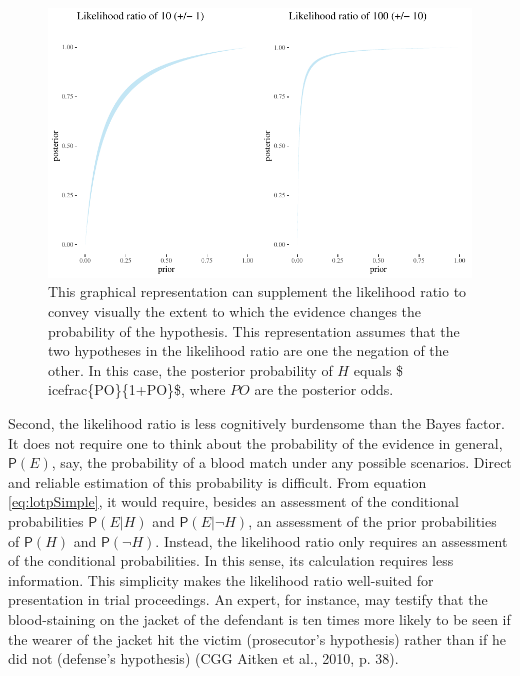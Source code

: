 \documentclass[
  letterpaper,
  DIV=11,
  numbers=noendperiod]{scrartcl}
\newcommand{\pr}[1]{\mathsf{P}(#1)}
\begin{document}
\begin{figure}[h]

{\centering \includegraphics[width=1\textwidth,height=\textheight]{Quart_lr-chapter6_files/figure-pdf/fig-effect-evidence-1.pdf}

}

\caption{\label{fig-effect-evidence}This graphical representation can
supplement the likelihood ratio to convey visually the extent to which
the evidence changes the probability of the hypothesis. This
representation assumes that the two hypotheses in the likelihood ratio
are one the negation of the other. In this case, the posterior
probability of \(H\) equals \$ icefrac\{PO\}\{1+PO\}\$, where \(PO\) are
the posterior odds.}

\end{figure}

Second, the likelihood ratio is less cognitively burdensome than the
Bayes factor. It does not require one to think about the probability of
the evidence in general, \(\pr{E}\), say, the probability of a blood
match under any possible scenarios. Direct and reliable estimation of
this probability is difficult. From equation \eqref{eq:lotpSimple}, it
would require, besides an assessment of the conditional probabilities
\(\pr{E\vert H}\) and \(\pr{E\vert \neg H}\), an assessment of the prior
probabilities of \(\pr{H}\) and \(\pr{\neg H}\). Instead, the likelihood
ratio only requires an assessment of the conditional probabilities. In
this sense, its calculation requires less information. This simplicity
makes the likelihood ratio well-suited for presentation in trial
proceedings. An expert, for instance, may testify that the
blood-staining on the jacket of the defendant is ten times more likely
to be seen if the wearer of the jacket hit the victim (prosecutor's
hypothesis) rather than if he did not (defense's hypothesis) (CGG Aitken
et al., 2010, p. 38).
\end{document}
